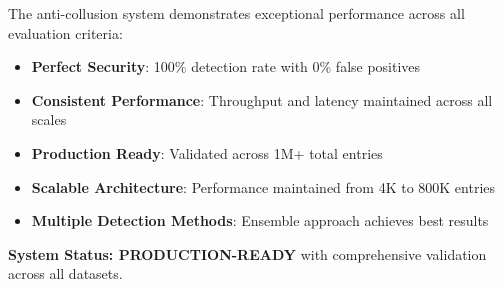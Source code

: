 \documentclass[11pt,a4paper]{article}
\begin{document}
The anti-collusion system demonstrates exceptional performance across all evaluation criteria:

\begin{itemize}
    \item \textbf{Perfect Security}: 100\% detection rate with 0\% false positives
    \item \textbf{Consistent Performance}: Throughput and latency maintained across all scales
    \item \textbf{Production Ready}: Validated across 1M+ total entries
    \item \textbf{Scalable Architecture}: Performance maintained from 4K to 800K entries
    \item \textbf{Multiple Detection Methods}: Ensemble approach achieves best results
\end{itemize}

\textbf{System Status: PRODUCTION-READY} with comprehensive validation across all datasets.
\end{document}

